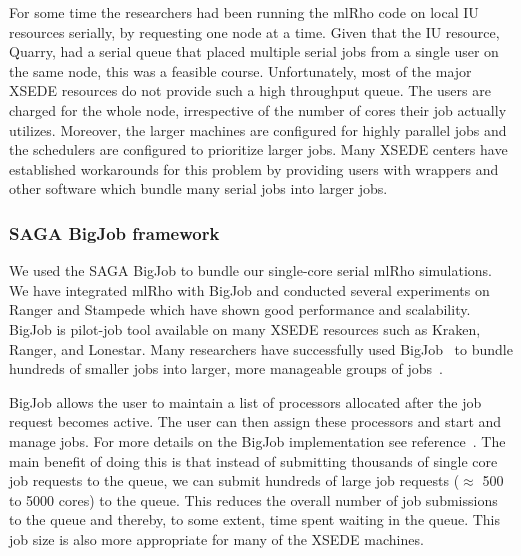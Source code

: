 \documentclass{sig-alternate}
\begin{document}
For some time the researchers had been running the mlRho code on local IU resources serially, by requesting
one node at a time. Given that the IU resource, Quarry, had a serial queue that placed multiple serial jobs from
a single user on the same node, this was a feasible course. Unfortunately, most of the major XSEDE resources do
not provide such a high throughput queue. The users are charged for the whole node, irrespective of the number
of cores their job actually utilizes. Moreover, the larger machines are configured for highly parallel jobs and
the schedulers are configured to prioritize larger jobs. Many XSEDE centers have established workarounds for this
problem by providing users with wrappers and other software which bundle many serial jobs into larger jobs.


\subsubsection{SAGA BigJob framework}
\label{sec:bigjob}

We used the SAGA BigJob to bundle our single-core serial mlRho simulations. We have integrated mlRho with
BigJob and conducted several experiments on Ranger and Stampede which have shown good performance and
scalability.  BigJob is pilot-job tool available on many XSEDE resources such as Kraken, Ranger, and
Lonestar. Many researchers have successfully used BigJob~\cite{bigjob_web} to bundle hundreds of smaller jobs
into larger, more manageable groups of jobs~\cite{Luckow:2008fp, async_repex11}.

BigJob allows the user to maintain a list of processors allocated after the job request becomes active. The
user can then assign these processors and start and manage jobs. For more details on the BigJob implementation
see reference~\cite{saga_bigjob_condor_cloud}. The main benefit of doing this is that instead of submitting
thousands of single core job requests to the queue, we can submit hundreds of large job requests ($\approx$
500 to 5000 cores) to the queue. This reduces the overall number of job submissions to the queue and thereby,
to some extent, time spent waiting in the queue. This job size is also more appropriate for many of the XSEDE
machines.
\end{document}
